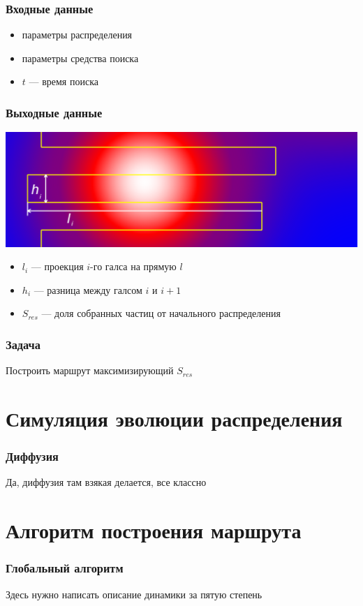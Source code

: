 \documentclass{beamer} %
\theoremstyle{definition} %
\begin{document}
\begin{frame}
  \frametitle{Входные данные}
\begin{itemize}
\item параметры распределения
\item параметры средства поиска
\item $t$ --- время поиска
\end{itemize}
\end{frame}

\begin{frame}
  \frametitle{Выходные данные}
\includegraphics[width=\textwidth]{pics/pic06-lh.png}
\begin{itemize}
  \item $l_i$ --- проекция $i$-го галса на прямую $l$
  \item $h_i$ --- разница между галсом $i$ и $i+1$
  \item $S_{res}$ --- доля собранных частиц от начального распределения
\end{itemize}

\end{frame}

\begin{frame}
  \frametitle{Задача}
  Построить маршрут максимизирующий $S_{res}$
\end{frame}

\section{Симуляция эволюции распределения} %

\begin{frame} 
\frametitle{Диффузия}

Да, диффузия там взякая делается, все классно
\end{frame}

\section{Алгоритм построения маршрута}
\begin{frame}
\frametitle{Глобальный алгоритм}
Здесь нужно написать описание динамики за пятую степень
\end{frame}
\end{document}
